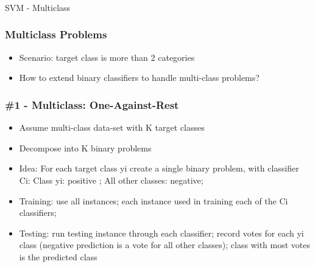 \begin{frame}[fragile]\frametitle{}
\begin{center}
{\Large SVM - Multiclass}
\end{center}
\end{frame}


\begin{frame}[fragile]\frametitle{Multiclass Problems}
\begin{itemize}
\item Scenario: target class is more than 2 categories
\item How to extend binary classifiers to handle multi-class problems?
\end{itemize}
\end{frame}

\begin{frame}[fragile]\frametitle{\#1 - Multiclass: One-Against-Rest}
\begin{itemize}
\item Assume multi-class data-set with K target classes
\item Decompose into K binary problems
\item Idea: For each target class yi create a single binary problem, with classifier Ci:
Class yi: positive ;
All other classes: negative;
\item Training: 
use all instances; each instance used in training each of the Ci classifiers;
\item Testing: 
run testing instance through each classifier;
record votes for each yi class (negative prediction is a vote for all other classes);
class with most votes is the predicted class

\end{itemize}
\end{frame}

